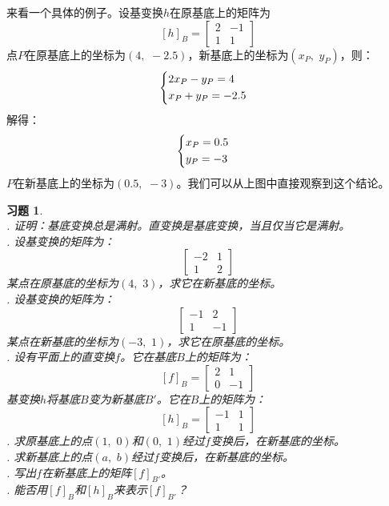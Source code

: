 \documentclass[12pt,UTF8]{ctexbook}
\newtheorem{xt}{习题}[section]
\begin{document}
来看一个具体的例子。设基变换$h$在原基底上的矩阵为
$$
\left[h\right]_{B} = 
\begin{bmatrix}
    2 & -1 \\ 1 & 1
\end{bmatrix}
$$
点$P$在原基底上的坐标为$(4,\,\, -2.5)$，新基底上的坐标为$(x_P,\,\, y_P)$，则：
\begin{alignat*}{1}
    &   \begin{dcases}
            2x_P  - y_P = 4 \\
            x_P + y_P = -2.5
        \end{dcases}
\end{alignat*}
解得：
\begin{alignat*}{1}
    &   \begin{dcases}
            x_P = 0.5 \\
            y_P = -3
        \end{dcases}
\end{alignat*}
$P$在新基底上的坐标为$(0.5, \,\, -3)$。我们可以从上图中直接观察到这个结论。

\begin{xt}
    \mbox{} \\
    . 证明：基底变换总是满射。直变换是基底变换，当且仅当它是满射。\\
    . 设基变换的矩阵为：
    $$
    \begin{bmatrix}
        -2 & 1 \\ 1 & 2
    \end{bmatrix}
    $$
    \indent 某点在原基底的坐标为$(4,\,\,3)$，求它在新基底的坐标。\\
    . 设基变换的矩阵为：
    $$
    \begin{bmatrix}
        -1 & 2 \\ 1 & -1
    \end{bmatrix}
    $$
    \indent 某点在新基底的坐标为$(-3,\,\,1)$，求它在原基底的坐标。\\
    . 设有平面上的直变换$f$。它在基底$B$上的矩阵为：
    $$
    \left[f\right]_{B} = 
    \begin{bmatrix}
        2 & 1 \\ 0 & -1
    \end{bmatrix}
    $$
    \indent 基变换$h$将基底$B$变为新基底$B'$。它在$B$上的矩阵为：
    $$
    \left[h\right]_{B} = 
    \begin{bmatrix}
        -1 & 1 \\ 1 & 1
    \end{bmatrix}
    $$
    . 求原基底上的点$(1,\,\,0)$和$(0,\,\,1)$经过$f$变换后，在新基底的坐标。\\
    . 求新基底上的点$(a,\,\,b)$经过$f$变换后，在新基底的坐标。\\
    . 写出$f$在新基底上的矩阵$[f]_{B'}$。\\
    . 能否用$[f]_{B}$和$[h]_{B}$来表示$[f]_{B'}$？
\end{xt}
\end{document}
